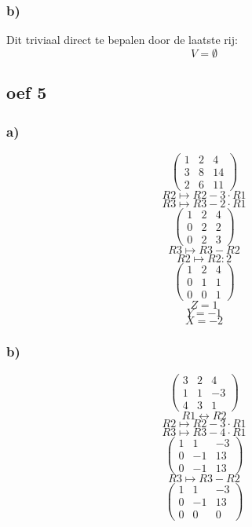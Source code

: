 \documentclass[lineaire_algebra_oplossingen.tex]{subfiles}
\begin{document}
\subsubsection*{b)}
Dit triviaal direct te bepalen door de laatste rij:
\[
V=\emptyset
\]
\subsection{oef 5}
\subsubsection*{a)}
\[
\begin{pmatrix}
1 &  2 &  4\\
3 &  8 &  14\\
2 &  6 &  11
\end{pmatrix}
\]
\[ R2 \longmapsto R2 -3\cdot R1\]
\[ R3 \longmapsto R3 -2\cdot R1\]
\[
\begin{pmatrix}
1 &  2 &  4\\
0 &  2 &  2\\
0 &  2 &  3
\end{pmatrix}
\]
\[ R3 \longmapsto R3 - R2\]
\[ R2 \longmapsto R2 : 2\]
\[
\begin{pmatrix}
1 &  2 &  4\\
0 &  1 &  1\\
0 &  0 &  1
\end{pmatrix}
\]
\[ Z=1\]
\[ Y=-1\]
\[ X=-2\]

\subsubsection*{b)}
\[
\begin{pmatrix}
3 &  2 &  4\\
1 &  1 &  -3\\
4 &  3 &  1
\end{pmatrix}
\]
\[R1 \leftrightarrow R2\]
\[ R2 \longmapsto R2 -3\cdot R1\]
\[ R3 \longmapsto R3 -4\cdot R1\]
\[
\begin{pmatrix}
1 &  1 &  -3\\
0 &  -1 &  13\\
0 &  -1 &  13
\end{pmatrix}
\]
\[ R3 \longmapsto R3 - R2\]
\[
\begin{pmatrix}
1 &  1 &  -3\\
0 &  -1 &  13\\
0 &  0 &  0
\end{pmatrix}
\]
\end{document}
